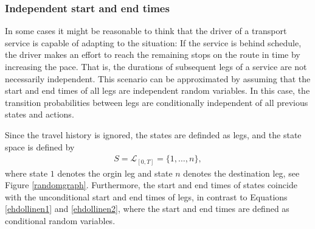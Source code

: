 \documentclass[dissertation,draft*]{aaltoseries}
\begin{document}
\subsubsection{Independent start and end times}
\label{independentstartandendtimes}
In some cases it might be reasonable
to think that the driver of a transport service is capable
of adapting to the situation: If the service is behind schedule,
the driver makes an effort to reach the remaining stops on the
route in time by increasing the pace. That is, the durations of
subsequent legs of a service are not necessarily independent. 
This scenario can be approximated by assuming that the start 
and end times of all legs are independent random variables.
In this case, the transition probabilities between legs are 
conditionally independent of all previous states and actions.

Since the travel history is ignored, the states are definded
as legs, and the state space is defined by
\begin{align}
\label{rekursio02}
 S = \mathcal{L}_{[0,T]} = \{1,\ldots,n\},
\end{align}
where state $1$ denotes the orgin leg and state $n$
denotes the destination leg, see Figure \ref{randomgraph}.
Furthermore, the start and end times of states coincide with the unconditional start and end
times of legs, in contrast to Equations \eqref{ehdollinen1} and \eqref{ehdollinen2}, where the start and end times are defined as conditional
random variables.
\end{document}
